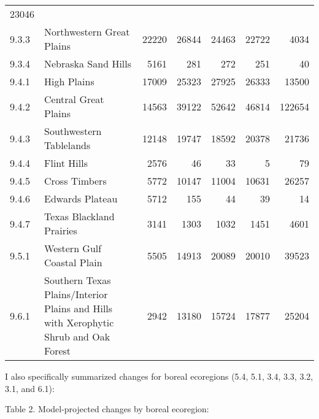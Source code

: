 \documentclass[]{article}
\begin{document}
\begin{longtable}[]{@{}llrrrrr@{}}
23046\tabularnewline
9.3.3 & Northwestern Great Plains & 22220 & 26844 & 24463 & 22722 &
4034\tabularnewline
9.3.4 & Nebraska Sand Hills & 5161 & 281 & 272 & 251 & 40\tabularnewline
9.4.1 & High Plains & 17009 & 25323 & 27925 & 26333 &
13500\tabularnewline
9.4.2 & Central Great Plains & 14563 & 39122 & 52642 & 46814 &
122654\tabularnewline
9.4.3 & Southwestern Tablelands & 12148 & 19747 & 18592 & 20378 &
21736\tabularnewline
9.4.4 & Flint Hills & 2576 & 46 & 33 & 5 & 79\tabularnewline
9.4.5 & Cross Timbers & 5772 & 10147 & 11004 & 10631 &
26257\tabularnewline
9.4.6 & Edwards Plateau & 5712 & 155 & 44 & 39 & 14\tabularnewline
9.4.7 & Texas Blackland Prairies & 3141 & 1303 & 1032 & 1451 &
4601\tabularnewline
9.5.1 & Western Gulf Coastal Plain & 5505 & 14913 & 20089 & 20010 &
39523\tabularnewline
9.6.1 & Southern Texas Plains/Interior Plains and Hills with Xerophytic
Shrub and Oak Forest & 2942 & 13180 & 15724 & 17877 &
25204\tabularnewline
\bottomrule
\end{longtable}

I also specifically summarized changes for boreal ecoregions (5.4, 5.1,
3.4, 3.3, 3.2, 3.1, and 6.1):

Table 2. Model-projected changes by boreal ecoregion:
\end{document}
